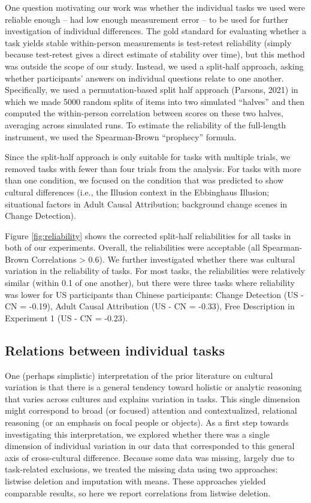 \documentclass[
  man,floatsintext]{apa6}
\begin{document}
One question motivating our work was whether the individual tasks we used were reliable enough -- had low enough measurement error -- to be used for further investigation of individual differences. The gold standard for evaluating whether a task yields stable within-person measurements is test-retest reliability (simply because test-retest gives a direct estimate of stability over time), but this method was outside the scope of our study. Instead, we used a split-half approach, asking whether participants' answers on individual questions relate to one another. Specifically, we used a permutation-based split half approach (Parsons, 2021) in which we made 5000 random splits of items into two simulated ``halves'' and then computed the within-person correlation between scores on these two halves, averaging across simulated runs. To estimate the reliability of the full-length instrument, we used the Spearman-Brown ``prophecy'' formula.

Since the split-half approach is only suitable for tasks with multiple trials, we removed tasks with fewer than four trials from the analysis. For tasks with more than one condition, we focused on the condition that was predicted to show cultural differences (i.e., the Illusion context in the Ebbinghaus Illusion; situational factors in Adult Causal Attribution; background change scenes in Change Detection).

Figure \ref{fig:reliability} shows the corrected split-half reliabilities for all tasks in both of our experiments. Overall, the reliabilities were acceptable (all Spearman-Brown Correlations \textgreater{} 0.6). We further investigated whether there was cultural variation in the reliability of tasks. For most tasks, the reliabilities were relatively similar (within 0.1 of one another), but there were three tasks where reliability was lower for US participants than Chinese participants: Change Detection (US - CN = -0.19), Adult Causal Attribution (US - CN = -0.33), Free Description in Experiment 1 (US - CN = -0.23).

\hypertarget{relations-between-individual-tasks}{%
\subsection{Relations between individual tasks}\label{relations-between-individual-tasks}}

One (perhaps simplistic) interpretation of the prior literature on cultural variation is that there is a general tendency toward holistic or analytic reasoning that varies across cultures and explains variation in tasks. This single dimension might correspond to broad (or focused) attention and contextualized, relational reasoning (or an emphasis on focal people or objects). As a first step towards investigating this interpretation, we explored whether there was a single dimension of individual variation in our data that corresponded to this general axis of cross-cultural difference. Because some data was missing, largely due to task-related exclusions, we treated the missing data using two approaches: listwise deletion and imputation with means. These approaches yielded comparable results, so here we report correlations from listwise deletion.
\end{document}
